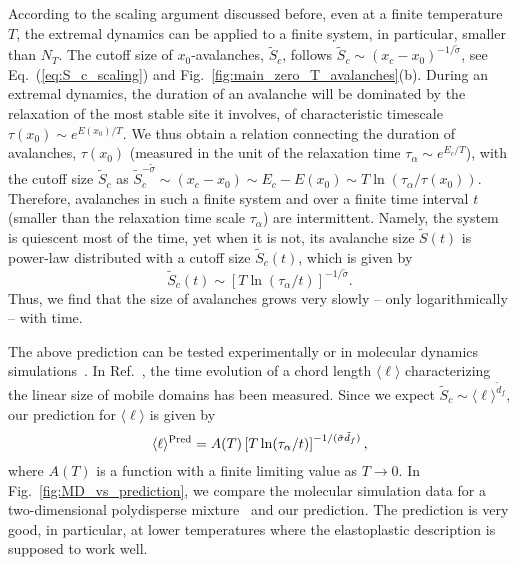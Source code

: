 \documentclass[pre,twocolumn,superscriptaddress,tightenlines,showpacs,longbibliography,floatfix,footinbib]{revtex4-1}
\begin{document}
According to the scaling argument discussed before, even at a finite temperature $T$, the extremal dynamics can be applied to a finite system, in particular, smaller than $N_T$.
The cutoff size of $x_0$-avalanches, $\tilde S_c$, follows $\tilde S_c \sim (x_c-x_0)^{-1/\tilde \sigma}$, see Eq.~(\ref{eq:S_c_scaling}) and Fig.~\ref{fig:main_zero_T_avalanches}(b).
During an extremal dynamics, the duration of an avalanche will be dominated by the relaxation of the most stable site it involves, of characteristic timescale $\tau(x_0) \sim e^{E(x_0)/T}$. We thus obtain a relation connecting the duration of avalanches, $\tau(x_0)$ (measured in the unit of the relaxation time $\tau_\alpha \sim e^{E_c/T}$), with the cutoff size $\tilde S_c$ as
$\tilde S_c^{-\tilde \sigma} \sim (x_c-x_0) \sim E_c-E(x_0) \sim T \ln(\tau_\alpha/\tau(x_0))$.
Therefore, avalanches in such a finite system and over a finite time interval $t$ (smaller than the relaxation time scale $\tau_\alpha$) are intermittent. Namely, the system is quiescent most of the time, yet when it is not, its avalanche size $\tilde S(t)$ is power-law distributed with a cutoff size $\tilde S_c(t)$, which is given by
\begin{equation}
    \tilde S_c(t) \sim \left[T\ln(\tau_\alpha/t)\right]^{-1/\tilde \sigma}.
    \label{eq:prediction_S_c}
\end{equation}
Thus, we find that the size of avalanches grows very slowly -- only logarithmically -- with time.

The above prediction can be tested experimentally or in molecular dynamics simulations~\cite{candelier2010spatiotemporal,scalliet2022thirty}.
In Ref.~\cite{scalliet2022thirty}, the time evolution of a chord length $\langle \ell \rangle$ characterizing the linear size of mobile domains has been measured. Since we expect $\tilde S_c \sim \langle \ell \rangle^{\tilde d_f}$, our prediction for $\langle \ell \rangle$ is given by
\begin{equation}
    \langle \ell \rangle^{\rm Pred} = A(T) \left[T\ln(\tau_\alpha/t)\right]^{-1/(\tilde \sigma \tilde d_f)},
    \label{eq:prediction_for_ell}
\end{equation}
where $A(T)$ is a function with a finite limiting value as $T\rightarrow 0$.
In Fig.~\ref{fig:MD_vs_prediction}, we compare the molecular simulation data for a two-dimensional polydisperse mixture~\cite{scalliet2022thirty} and our prediction.
The prediction is very good, in particular, at lower temperatures where the elastoplastic description is supposed to work well.
\end{document}
